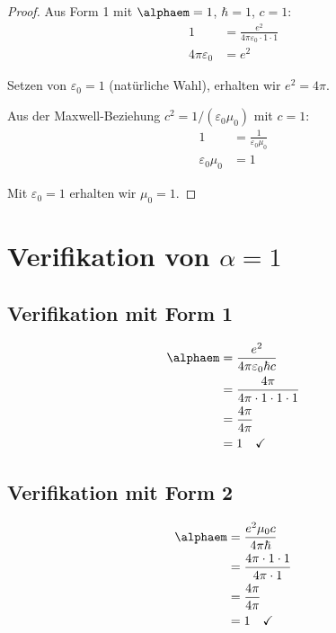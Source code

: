 	\begin{proof}
		Aus Form 1 mit $\alphaem = 1$, $\hbar = 1$, $c = 1$:
		\begin{align}
			1 &= \frac{e^2}{4\pi\varepsilon_0 \cdot 1 \cdot 1}\\
			4\pi\varepsilon_0 &= e^2
		\end{align}
		
		Setzen von $\varepsilon_0 = 1$ (natürliche Wahl), erhalten wir $e^2 = 4\pi$.
		
		Aus der Maxwell-Beziehung $c^2 = 1/(\varepsilon_0\mu_0)$ mit $c = 1$:
		\begin{align}
			1 &= \frac{1}{\varepsilon_0\mu_0}\\
			\varepsilon_0\mu_0 &= 1
		\end{align}
		
		Mit $\varepsilon_0 = 1$ erhalten wir $\mu_0 = 1$.
	\end{proof}
	
	\section{Verifikation von $\alpha = 1$}
	
	\subsection{Verifikation mit Form 1}
	
	\begin{proof_step}
		\begin{align}
			\alphaem &= \frac{e^2}{4\pi\varepsilon_0\hbar c}\\
			&= \frac{4\pi}{4\pi \cdot 1 \cdot 1 \cdot 1}\\
			&= \frac{4\pi}{4\pi}\\
			&= 1 \quad \checkmark
		\end{align}
	\end{proof_step}
	
	\subsection{Verifikation mit Form 2}
	
	\begin{proof_step}
		\begin{align}
			\alphaem &= \frac{e^2 \mu_0 c}{4\pi \hbar}\\
			&= \frac{4\pi \cdot 1 \cdot 1}{4\pi \cdot 1}\\
			&= \frac{4\pi}{4\pi}\\
			&= 1 \quad \checkmark
		\end{align}
	\end{proof_step}
	
